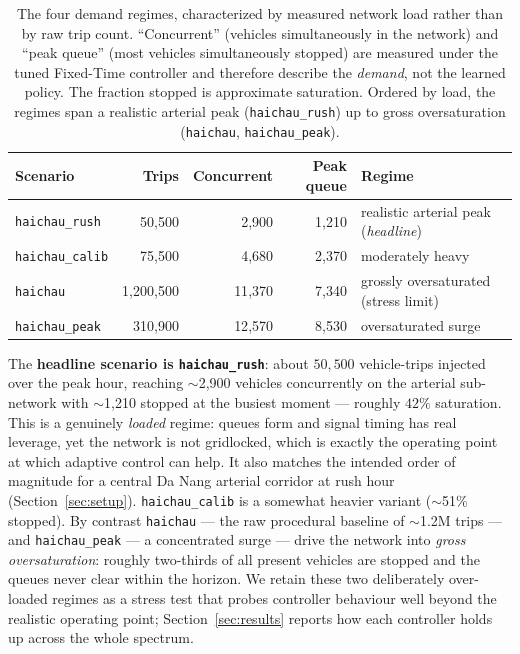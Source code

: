 \begin{table}[H]
\centering
\caption{The four demand regimes, characterized by measured network load rather than by
raw trip count. ``Concurrent'' (vehicles simultaneously in the network) and ``peak queue''
(most vehicles simultaneously stopped) are measured under the tuned Fixed-Time controller
and therefore describe the \emph{demand}, not the learned policy. The fraction stopped is
approximate saturation. Ordered by load, the regimes span a realistic arterial peak
(\texttt{haichau\_rush}) up to gross oversaturation (\texttt{haichau}, \texttt{haichau\_peak}).}
\label{tab:scenarios}
\begin{tabular}{@{}lrrrl@{}}
\toprule
\textbf{Scenario} & \textbf{Trips} & \textbf{Concurrent} & \textbf{Peak queue} & \textbf{Regime} \\
\midrule
\texttt{haichau\_rush} & 50{,}500      & 2{,}900  & 1{,}210 & realistic arterial peak (\emph{headline}) \\
\texttt{haichau\_calib}& 75{,}500      & 4{,}680  & 2{,}370 & moderately heavy \\
\texttt{haichau}       & 1{,}200{,}500 & 11{,}370 & 7{,}340 & grossly oversaturated (stress limit) \\
\texttt{haichau\_peak} & 310{,}900     & 12{,}570 & 8{,}530 & oversaturated surge \\
\bottomrule
\end{tabular}
\end{table}

The \textbf{headline scenario is \texttt{haichau\_rush}}: about $50{,}500$ vehicle-trips
injected over the peak hour, reaching $\sim$2{,}900 vehicles concurrently on the arterial
sub-network with $\sim$1{,}210 stopped at the busiest moment --- roughly $42\%$ saturation.
This is a genuinely \emph{loaded} regime: queues form and signal timing has real leverage,
yet the network is not gridlocked, which is exactly the operating point at which adaptive
control can help. It also matches the intended order of magnitude for a central Da Nang
arterial corridor at rush hour (Section~\ref{sec:setup}). \texttt{haichau\_calib} is a
somewhat heavier variant ($\sim$51\% stopped). By contrast \texttt{haichau} --- the raw
procedural baseline of $\sim$1.2M trips --- and \texttt{haichau\_peak} --- a concentrated
surge --- drive the network into \emph{gross oversaturation}: roughly two-thirds of all
present vehicles are stopped and the queues never clear within the horizon. We retain these
two deliberately over-loaded regimes as a stress test that probes controller behaviour well
beyond the realistic operating point; Section~\ref{sec:results} reports how each controller
holds up across the whole spectrum.

